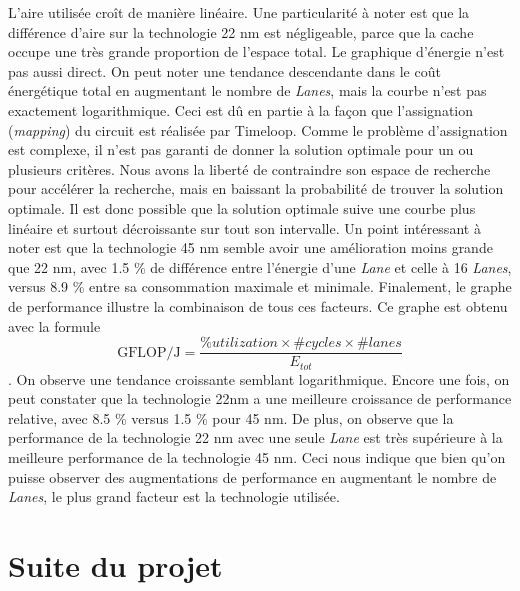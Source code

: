 \documentclass[11pt,letterpaper]{article}
\begin{document}
\begin{multicols}{2}
    L'aire utilisée croît de manière linéaire. Une particularité à noter est que la différence d'aire sur la technologie 
    22 nm est négligeable, parce que la cache occupe une très grande proportion de l'espace total. 
    Le graphique d'énergie n'est pas aussi direct. On peut noter une tendance descendante dans le coût énergétique total 
    en augmentant le nombre de \textit{Lanes}, mais la courbe n'est pas exactement logarithmique. Ceci est dû en partie à 
    la façon que l'assignation (\textit{mapping}) du circuit est réalisée par Timeloop. Comme le problème d'assignation
    est complexe, il n'est pas garanti de donner la solution optimale pour un ou plusieurs critères. Nous avons la liberté
    de contraindre son espace de recherche pour accélérer la recherche, mais en baissant la probabilité de trouver la 
    solution optimale. Il est donc possible que la solution optimale suive une courbe plus linéaire et surtout décroissante
    sur tout son intervalle. Un point intéressant à noter est que la technologie 45 nm semble avoir une amélioration moins 
    grande que 22 nm, avec 1.5 \% de différence entre l'énergie d'une \textit{Lane} et celle à 16 \textit{Lanes}, versus 
    8.9 \% entre sa consommation maximale et minimale. Finalement, le graphe de performance illustre la combinaison de tous 
    ces facteurs. Ce graphe est obtenu avec la formule $$\text{GFLOP/J} = \frac{\%utilization \times \#cycles \times \#lanes}{E_{tot}}$$.
    On observe une tendance croissante semblant logarithmique. Encore une fois, on peut constater que la technologie 22nm 
    a une meilleure croissance de performance relative, avec 8.5 \% versus 1.5 \% pour 45 nm. De plus, on observe que la 
    performance de la technologie 22 nm avec une seule \textit{Lane} est très supérieure à la meilleure performance de la 
    technologie 45 nm. Ceci nous indique que bien qu'on puisse observer des augmentations de performance en augmentant le nombre
    de \textit{Lanes}, le plus grand facteur est la technologie utilisée.
    

    \end{multicols}

\section*{Suite du projet}
\end{document}
